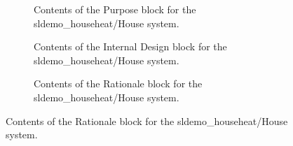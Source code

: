 \documentclass{mcscert}
\newcommand{\sddblks}{SDD Blocks Library}
\begin{document}
\begin{figure}
	\centering
	\caption{Contents of all \sddblks{} blocks for the sldemo\_househeat/House	system.}
	\label{fig:House-sdd-blocks-2}
	\begin{subfigure}[t]{\textwidth}
		\caption{Contents of the Purpose block for the sldemo\_househeat/House system.}
		\label{fig:house-purpose-2}
	\end{subfigure}
	\begin{subfigure}[t]{\textwidth}
		\caption{Contents of the Internal Design block for the sldemo\_househeat/House system.}
		\label{fig:house-int-des-2}
	\end{subfigure}
	\begin{subfigure}[t]{0.45\textwidth}
		\caption{Contents of the Rationale block for the sldemo\_househeat/House system.}

\end{subfigure}
\end{figure}
\end{document}
